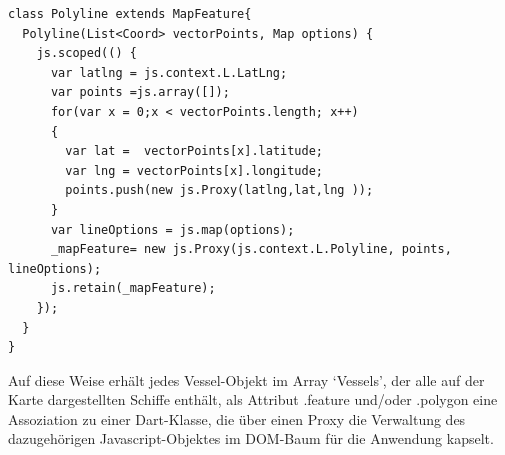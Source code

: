 \begin{lstlisting}[caption= Konstructor des Dart-Objekts Polyline, label = Constructor Polyline]
class Polyline extends MapFeature{
  Polyline(List<Coord> vectorPoints, Map options) {
    js.scoped(() {
      var latlng = js.context.L.LatLng;
      var points =js.array([]);
      for(var x = 0;x < vectorPoints.length; x++)
      {
        var lat =  vectorPoints[x].latitude;
        var lng = vectorPoints[x].longitude;
        points.push(new js.Proxy(latlng,lat,lng ));
      }
      var lineOptions = js.map(options);
      _mapFeature= new js.Proxy(js.context.L.Polyline, points, lineOptions);
      js.retain(_mapFeature);
    });
  }
}
\end{lstlisting}
Auf diese Weise erhält jedes Vessel-Objekt im Array ‘Vessels’, der alle auf der Karte dargestellten Schiffe enthält, als Attribut .feature und/oder .polygon eine Assoziation zu einer Dart-Klasse, die über einen Proxy die Verwaltung des dazugehörigen Javascript-Objektes im DOM-Baum für die Anwendung kapselt.

